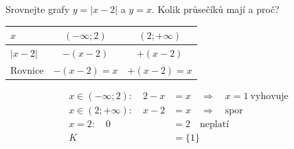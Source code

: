 \documentclass[11pt,a4paper]{article}
\begin{document}
\begin{zadaniReseniBox}[title={Rozšíření 1}]
Srovnejte grafy $y=|x-2|$ a $y=x$. Kolik průsečíků mají a proč?
\tcblower
\begin{center}
\begingroup\footnotesize
\renewcommand{\arraystretch}{1.32}
\begin{tabular}{@{}lcc@{}}
\toprule
$x$ & $(-\infty;2)$ & $(2;+\infty)$ \\
\midrule
$|x - 2|$ & $-(x - 2)$ & $+(x - 2)$ \\
\midrule
Rovnice & $-(x - 2)=x$ & $+(x - 2)=x$ \\
\bottomrule
\end{tabular}
\endgroup
\end{center}
\[\begin{aligned}x\in (-\infty;2):\quad 2 - x &= x\quad\Longrightarrow\quad x=1\ \text{vyhovuje}\\[2pt]
x\in (2;+\infty):\quad x - 2 &= x\quad\Longrightarrow\quad \text{spor}\\[2pt]
x=2:\quad 0 &= 2\quad\text{neplatí}\\[2pt]
K&=\{1\}\end{aligned}\]
\end{zadaniReseniBox}
\end{document}
